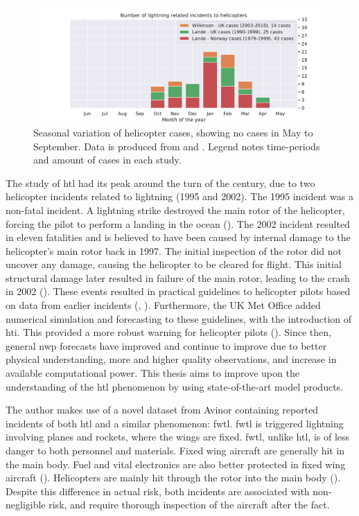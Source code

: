 \begin{figure}
    \centering
    \includegraphics[width=\textwidth]{Figures/yearlydistribution_withoutmine.pdf}
    \caption{Seasonal variation of helicopter cases, showing no cases in May to September. Data is produced from \cite{lande1999} and \cite{wilkinson2013}. Legend notes time-periods and amount of cases in each study.}
    \label{fig:landewilk}
\end{figure}

The study of \acrshort{htl} had its peak around the turn of the century, due to two helicopter incidents related to lightning (1995 and 2002). The 1995 incident was a non-fatal incident. A lightning strike destroyed the main rotor of the helicopter, forcing the pilot to perform a landing in the ocean (\cite{smart1997}). The 2002 incident resulted in eleven fatalities and is believed to have been caused by internal damage to the helicopter's main rotor back in 1997. The initial inspection of the rotor did not uncover any damage, causing the helicopter to be cleared for flight. This initial structural damage later resulted in failure of the main rotor, leading to the crash in 2002 (\cite{smart2005}). These events resulted in practical guidelines to helicopter pilots based on data from earlier incidents (\cite{lande1999}, \cite{hardwick1999}). Furthermore, the UK Met Office added numerical simulation and forecasting to these guidelines, with the introduction of \acrfull{hti}. This provided a more robust warning for helicopter pilots (\cite{wilkinson2013}). Since then, general \acrfull{nwp} forecasts have improved and continue to improve due to better  physical understanding, more and higher quality observations, and increase in available computational power. This thesis aims to improve upon the understanding of the \acrshort{htl} phenomenon by using state-of-the-art model products.

The author makes use of a novel dataset from Avinor containing reported incidents of both  \acrshort{htl} and a similar phenomenon: \acrfull{fwtl}. \acrshort{fwtl} is triggered lightning involving planes and rockets, where the wings are fixed. \acrshort{fwtl}, unlike \acrshort{htl}, is of less danger to both personnel and materials. Fixed wing aircraft are generally hit in the main body. Fuel and vital electronics are also better protected in fixed wing aircraft (\cite{petrov2012}). Helicopters are mainly hit through the rotor into the main body (\cite{lande1999}). Despite this difference in actual risk, both incidents are associated with non-negligible risk, and require thorough inspection of the aircraft after the fact.

